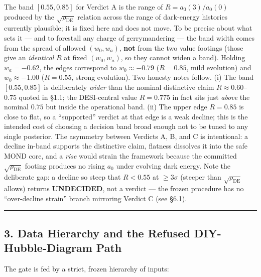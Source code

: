 \documentclass[
]{article}
\begin{document}
The band \([0.55,0.85]\) for Verdict A is the range of
\(R=a_0(3)/a_0(0)\) produced by the \(\sqrt{\rho_\mathrm{DE}}\) relation
across the range of dark-energy histories currently plausible; it is
fixed here and does not move. To be precise about what sets it --- and
to forestall any charge of gerrymandering --- the band width comes from
the spread of allowed \((w_0,w_a)\), \textbf{not} from the two value
footings (those give an \emph{identical} \(R\) at fixed \((w_0,w_a)\),
so they cannot widen a band). Holding \(w_a=-0.62\), the edges
correspond to \(w_0\approx-0.79\) (\(R=0.85\), mild evolution) and
\(w_0\approx-1.00\) (\(R=0.55\), strong evolution). Two honesty notes
follow. (i) The band \([0.55,0.85]\) is deliberately \emph{wider} than
the nominal distinctive claim \(R\approx0.60\)--\(0.75\) quoted in §1.1;
the DESI-central value \(R=0.775\) in fact sits just \emph{above} the
nominal \(0.75\) but inside the operational band. (ii) The upper edge
\(R=0.85\) is close to flat, so a ``supported'' verdict at that edge is
a weak decline; this is the intended cost of choosing a decision band
broad enough not to be tuned to any single posterior. The asymmetry
between Verdicts A, B, and C is intentional: a decline in-band supports
the distinctive claim, flatness dissolves it into the safe MOND core,
and a \emph{rise} would strain the framework because the committed
\(\sqrt{\rho_\mathrm{DE}}\) footing produces no rising \(a_0\) under
evolving dark energy. Note the deliberate gap: a decline so steep that
\(R<0.55\) at \(\ge3\sigma\) (steeper than \(\sqrt{\rho_\mathrm{DE}}\)
allows) returns \textbf{UNDECIDED}, not a verdict --- the frozen
procedure has no ``over-decline strain'' branch mirroring Verdict C (see
§6.1).

\begin{center}\rule{0.5\linewidth}{0.5pt}\end{center}

\subsection{3. Data Hierarchy and the Refused DIY-Hubble-Diagram
Path}\label{data-hierarchy-and-the-refused-diy-hubble-diagram-path}

The gate is fed by a strict, frozen hierarchy of inputs:
\end{document}
